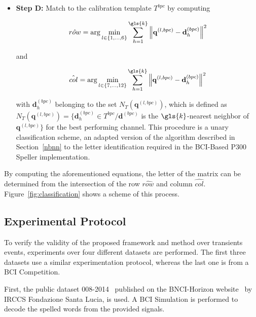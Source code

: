 \begin{itemize}

\item \textbf{Step D:} Match to the calibration template $T^{bpc}$ by computing  

\begin{equation}
\hat{row} = \arg \min_{l \in \{1,\dots,6\}} \sum_{h=1}^{\gls{k}}  {\left\lVert \mathbf{q}^{(l,bpc)} -  \mathbf{d}_{h}^{(bpc)} \right\rVert}  ^{2}
\label{eq:multiclassificationrow}
\end{equation}

\noindent and

\begin{equation}
\hat{col} = \arg \min_{l \in \{7,\dots,12\}} \sum_{h=1}^{\gls{k}}  {\left\lVert \mathbf{q}^{(l,bpc)} -  \mathbf{d}_{h}^{(bpc)} \right\rVert}  ^{2}
\label{eq:multiclassificationcol}
\end{equation}

\noindent with $\mathbf{d}_{h}^{(bpc)}$ belonging to the set $N_T( \mathbf{q}^{(l,bpc)}  )$, which is defined as $N_T(\mathbf{q}^{(l,bpc)} ) = \{ \mathbf{d}_{h}^{(bpc)} \in T^{bpc} /  \mathbf{d}^{(bpc)} $  is the $\gls{k}$-nearest neighbor of $ \mathbf{q}^{(l,bpc)} \}$ for the best performing channel.  This procedure is a unary classification scheme, an adapted version of the algorithm described in Section~\ref{nbnn} to the letter identification required in the BCI-Based P300 Speller implementation.

\end{itemize}
By computing the aforementioned equations, the letter of the matrix can be determined from the intersection of the row $ \hat{row} $ and column $ \hat{col} $. 
Figure~\ref{fig:classification} shows a scheme of this process. 


\subsection{Experimental Protocol} \label{Protocol}


To verify the validity of the proposed framework and method over transients events, experiments over four different datasets are performed.  The first three datasets use a similar experimentation protocol, whereas the last one is from a BCI Competition.

First, the public dataset 008-2014~\cite{Riccio2013} published on the BNCI-Horizon website~\cite{Brunner2014} by  IRCCS Fondazione Santa Lucia, is used. A BCI Simulation is performed to decode the spelled words from the provided signals.


